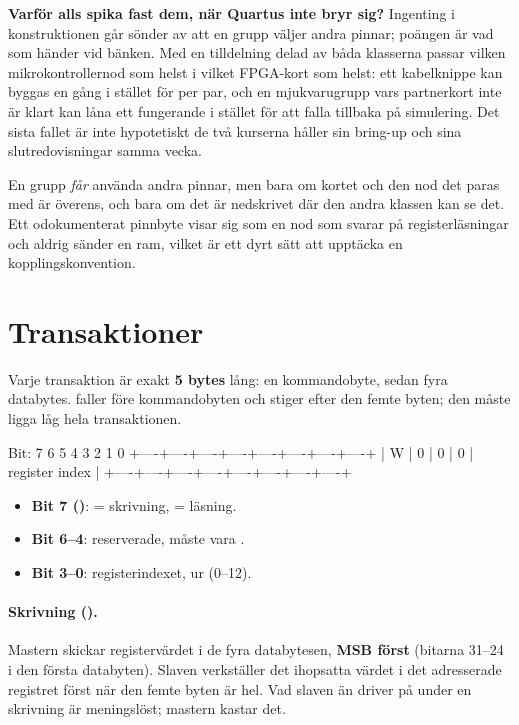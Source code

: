 \textbf{Varför alls spika fast dem, när Quartus inte bryr sig?} Ingenting i konstruktionen går sönder
av att en grupp väljer andra pinnar; poängen är vad som händer vid bänken. Med en tilldelning delad
av båda klasserna passar vilken mikrokontrollernod som helst i vilket FPGA-kort som helst: ett
kabelknippe kan byggas en gång i stället för per par, och en mjukvarugrupp vars partnerkort inte är
klart kan låna ett fungerande i stället för att falla tillbaka på simulering. Det sista fallet är
inte hypotetiskt \textemdash{} de två kurserna håller sin bring-up och sina slutredovisningar samma
vecka.

En grupp \emph{får} använda andra pinnar, men bara om kortet och den nod det paras med är överens, och
bara om det är nedskrivet där den andra klassen kan se det. Ett odokumenterat pinnbyte visar sig som
en nod som svarar på registerläsningar och aldrig sänder en ram, vilket är ett dyrt sätt att upptäcka
en kopplingskonvention.

\section{Transaktioner}
\label{app:protocol:transactions}

Varje transaktion är exakt \textbf{5 bytes} lång: en kommandobyte, sedan fyra databytes. 
faller före kommandobyten och stiger efter den femte byten; den måste ligga låg hela transaktionen.

\begin{textdrawing}
Bit:      7    6    5    4    3    2    1    0
        +----+----+----+----+----+----+----+----+
        | W  | 0  | 0  | 0  |   register index  |
        +----+----+----+----+----+----+----+----+
\end{textdrawing}

\begin{itemize}
  \item \textbf{Bit 7 ()}:  = skrivning,  = läsning.
  \item \textbf{Bit 6--4}: reserverade, måste vara .
  \item \textbf{Bit 3--0}: registerindexet,  ur  (0--12).
\end{itemize}

\paragraph{Skrivning ().}
Mastern skickar registervärdet i de fyra databytesen, \textbf{MSB först} (bitarna 31--24 i den första
databyten). Slaven verkställer det ihopsatta värdet i det adresserade registret först när den femte
byten är hel. Vad slaven än driver på  under en skrivning är meningslöst; mastern kastar
det.


